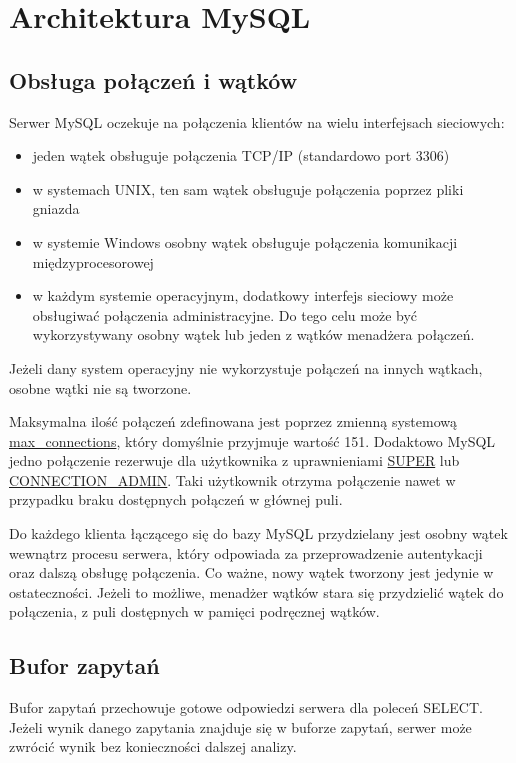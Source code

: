 \section{Architektura MySQL}

\subsection{Obsługa połączeń i wątków}
Serwer MySQL oczekuje na połączenia klientów na wielu interfejsach sieciowych:
\begin{itemize}
\item jeden wątek obsługuje połączenia TCP/IP (standardowo port 3306)
\item w systemach UNIX, ten sam wątek obsługuje połączenia poprzez pliki gniazda
\item w systemie Windows osobny wątek obsługuje połączenia komunikacji międzyprocesorowej
\item w każdym systemie operacyjnym, dodatkowy interfejs sieciowy może obsługiwać połączenia administracyjne. Do tego celu może być wykorzystywany osobny wątek lub jeden z wątków menadżera połączeń.
\end{itemize}

Jeżeli dany system operacyjny nie wykorzystuje połączeń na innych wątkach, osobne wątki nie są tworzone.

Maksymalna ilość połączeń zdefinowana jest poprzez zmienną systemową \underline{max\_connections}, który domyślnie przyjmuje wartość 151. Dodaktowo MySQL jedno połączenie rezerwuje dla użytkownika z uprawnieniami \underline{SUPER} lub \underline{CONNECTION\_ADMIN}. Taki użytkownik otrzyma połączenie nawet w przypadku braku dostępnych połączeń w głównej puli.

Do każdego klienta łączącego się do bazy MySQL przydzielany jest osobny wątek wewnątrz procesu serwera, który odpowiada za przeprowadzenie autentykacji oraz dalszą obsługę połączenia. Co ważne, nowy wątek tworzony jest jedynie w ostateczności. Jeżeli to możliwe, menadżer wątków stara się przydzielić wątek do połączenia, z puli dostępnych w pamięci podręcznej wątków.

\subsection{Bufor zapytań}
Bufor zapytań przechowuje gotowe odpowiedzi serwera dla poleceń SELECT. Jeżeli wynik danego zapytania znajduje się w buforze zapytań, serwer może zwrócić wynik bez konieczności dalszej analizy.

